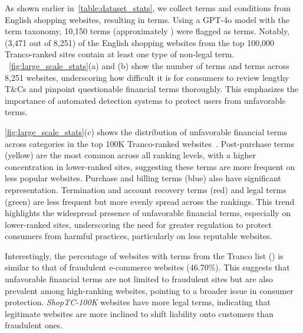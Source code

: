 \label{sec:categoring}


As shown earlier in~\autoref{table:dataset_stats},  we collect terms and conditions from \websitecnt English shopping websites, resulting in \termcnt terms. Using a GPT-4o model with the \termname term taxonomy, 10,150 terms (approximately \termpct) were flagged as \termname terms. Notably, \websitepct (3,471 out of 8,251) of the English shopping websites from the top 100,000 Tranco-ranked sites contain at least one type of non-legal \termname term. ~\autoref{fig:large_scale_stats}(a) and (b) show the number of terms and \termname terms across 8,251 websites, underscoring how difficult it is for consumers to review lengthy T\&Cs and pinpoint questionable financial terms thoroughly. This emphasizes the importance of automated detection systems to protect users from unfavorable terms.


\autoref{fig:large_scale_stats}(c) shows the distribution of unfavorable financial terms across categories in the top 100K Tranco-ranked websites~\citep{tranco}. Post-purchase terms (yellow) are the most common across all ranking levels, with a higher concentration in lower-ranked sites, suggesting these terms are more frequent on less popular websites. Purchase and billing terms (blue) also have significant representation. Termination and account recovery terms (red) and legal terms (green) are less frequent but more evenly spread across the rankings. This trend highlights the widespread presence of unfavorable financial terms, especially on lower-ranked sites, underscoring the need for greater regulation to protect consumers from harmful practices, particularly on less reputable websites.


Interestingly, the percentage of websites with \termname terms from the Tranco list (\websitepct) is similar to that of fraudulent e-commerce websites (46.70\%). This suggests that unfavorable financial terms are not limited to fraudulent sites but are also prevalent among high-ranking websites, pointing to a broader issue in consumer protection. \textit{ShopTC-100K} websites have more \termname legal terms, indicating that legitimate websites are more inclined to shift liability onto customers than fraudulent ones.



